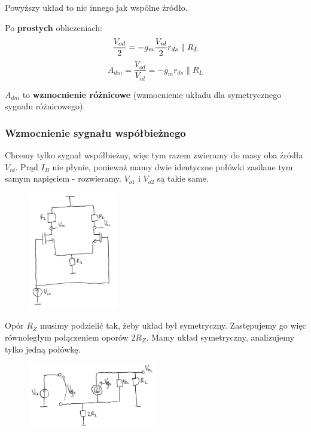 \documentclass[10pt,a4paper]{article}
\begin{document}
Powyższy układ to nic innego jak wspólne źródło.

Po \textbf{prostych} obliczeniach:
\begin{equation}
\dfrac{V_{od}}{2} =-g_{m}\dfrac{V_{id}}{2}r_{ds}\parallel R_{L} \\
\end{equation}
\begin{equation}
A_{dm}=\dfrac{V_{od}}{V_{id}}=-g_{m} r_{ds} \parallel R_{L}
\end{equation}

$A_{dm}$ to \textbf{wzmocnienie różnicowe} (wzmocnienie układu dla symetrycznego sygnału różnicowego).

\subsubsection{Wzmocnienie sygnału współbieżnego}

Chcemy tylko sygnał współbieżny, więc tym razem zwieramy do masy oba źródła $V_{id}$. Prąd $I_{B}$ nie płynie, ponieważ mamy dwie identyczne połówki zasilane tym samym napięciem - rozwieramy. $V_{o1}$ i $V_{o2}$ są takie same. 
\begin{figure}[H]
\centering
\includegraphics[width=0.35\textwidth]{roznicowy_wsp.png}
\end{figure}

Opór $R_{Z}$ musimy podzielić tak, żeby układ był symetryczny. Zastępujemy go więc równoległym połączeniem oporów $2R_{Z}$. Mamy układ symetryczny, analizujemy tylko jedną połówkę.
\begin{figure}[H]
\centering
\includegraphics[width=0.5\textwidth]{roznicowy_wsp_malosyg.png}
\end{figure}
\end{document}
